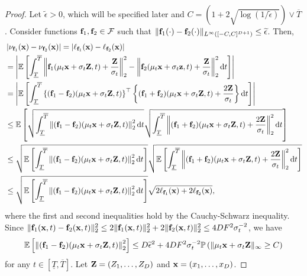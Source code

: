 \documentclass[twoside,11pt]{article}
\def\cF{\mathcal F}
\newcommand{\bff}{{\bf f}}
\newcommand{\bx}{{\bf x}}
\newcommand{\bz}{{\bf z}}
\newcommand{\bZ}{{\bf Z}}
\newcommand{\bbE}{{\mathbb E}}
\newcommand{\bbP}{{\mathbb P}}
\newcommand{\be}{\begin{equation}}
\newcommand{\ee}{\end{equation}}
\newcommand{\bean}{\setlength\arraycolsep{1pt}\begin{eqnarray*}}
\newcommand{\eean}{\end{eqnarray*}}
\def\d{{\rm d}}
\begin{document}
\begin{proof}
Let $\widetilde \epsilon > 0$, which will be specified later and $C = (1 + 2 \sqrt{\log (1 / \widetilde \epsilon)}) \vee \overline{T}$.
Consider functions $\bff_1, \bff_2 \in \cF$ such that $\| \bff_1(\cdot) - \bff_2(\cdot) \|_{L^{\infty}([-C,C]^{D+1})} \leq \widetilde \epsilon$.
Then,
\be
\begin{split}
& \left\vert \nu_{\bff_1}(\bx) - \nu_{\bff_2}(\bx)  \right\vert
 = \left\vert \ell_{\bff_1}(\bx) - \ell_{\bff_2}(\bx)  \right\vert
\\
& = \left\vert \bbE \left[ \int_{\underline{T}}^{\overline{T}} \left\| \bff_1(\mu_t \bx + \sigma_t \bZ,t) + \frac{\bZ}{\sigma_t} \right\|_2^2 - \left\| \bff_2(\mu_t \bx + \sigma_t \bz,t) + \frac{\bZ}{\sigma_t} \right\|_2^2 \d t   \right] \right\vert
\\
& = \left\vert \bbE \left[ \int_{\underline{T}}^{\overline{T}} \left\{ (\bff_1 - \bff_2) (\mu_t \bx + \sigma_t \bZ,t)  \right\}^{\top} \left\{ (\bff_1 + \bff_2) (\mu_t \bx + \sigma_t \bZ,t)  + \frac{2\bZ}{\sigma_t} \right\} \d t
\right] \right\vert
\\
& \leq \bbE\left[  \sqrt{ \int_{\underline{T}}^{\overline{T}} \left\| (\bff_1 - \bff_2)(\mu_t \bx + \sigma_t \bZ,t)  \right\|_2^2 \d t }
\sqrt{ \int_{\underline{T}}^{\overline{T}} \left\| (\bff_1 + \bff_2)(\mu_t \bx + \sigma_t \bZ,t) + \frac{2\bZ}{\sigma_t}  \right\|_2^2 \d t }
\right]
\\
& \leq \sqrt{ \bbE\left[ \int_{\underline{T}}^{\overline{T}} \left\| (\bff_1 - \bff_2)(\mu_t \bx + \sigma_t \bZ,t)  \right\|_2^2 \d t  \right] }
\sqrt{ \bbE\left[ 
 \int_{\underline{T}}^{\overline{T}} \left\| (\bff_1 + \bff_2)(\mu_t \bx + \sigma_t \bZ,t) + \frac{2\bZ}{\sigma_t}  \right\|_2^2 \d t 
\right] }
\\
& \leq \sqrt{ \bbE\left[ \int_{\underline{T}}^{\overline{T}} \left\| (\bff_1 - \bff_2)(\mu_t \bx + \sigma_t \bZ,t)  \right\|_2^2 \d t  \right] }
\sqrt{ 2 \ell_{\bff_1}(\bx) + 2 \ell_{\bff_2}(\bx) }, 
\label{eq:exbddiff}
\end{split}
\ee
where the first and second inequalities hold by the Cauchy-Schwarz inequality.
Since $\| \bff_1 (\bx,t) - \bff_2 (\bx,t) \|_{2}^2 \leq 2 \| \bff_1(\bx,t) \|_2^2 + 2 \| \bff_2 (\bx,t)\|_2^2 \leq 4 D F^2 \sigma_{t}^{-2}$, we have
\bean
 \bbE\left[ \left\| (\bff_1 - \bff_2)(\mu_t \bx + \sigma_t \bZ,t)  \right\|_2^2 \right] \leq D \widetilde \epsilon^2 + 4 D F^2 \sigma_{t}^{-2} \bbP \left( \| \mu_t\bx + \sigma_{t}\bZ \|_{\infty} \geq C \right)
\eean
for any $t \in [\underline{T}, \overline{T}]$.
Let $\bZ = (Z_1,\ldots,Z_{D})$ and $\bx = (x_1,\ldots,x_{D})$.

\end{proof}
\end{document}
